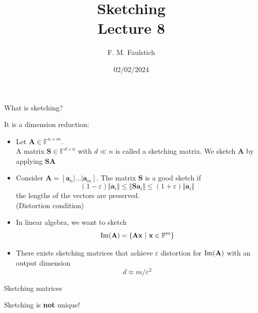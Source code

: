 \documentclass{beamer}
\title{
Sketching\\
Lecture 8
}
\author{F. M. Faulstich}
\date{02/02/2024}
\newcommand{\bvec}[1]{\mathbf{#1}}
\newcommand{\va}{\bvec{a}}
\newcommand{\vx}{\bvec{x}}
\newcommand{\vA}{\bvec{A}}
\newcommand{\vS}{\bvec{S}}
\newcommand{\bitem}{\item[$\bullet$]}
\begin{document}
\frame{\titlepage}

\begin{frame}{What is sketching?}

It is a dimension reduction:\\
\begin{itemize}
    \bitem Let $\vA \in \mathbb{F}^{n \times m}$. \\
    A matrix $\vS\in \mathbb{F}^{d \times n}$ with $d \ll n$ is called a sketching matrix. We sketch $\vA$ by applying $\vS \vA$
    \pause
    \bitem Consider $\vA = [\va_n|...|\va_m]$. The matrix $\vS$ is a good sketch if
    $$
    (1-\varepsilon) \Vert \va_i \Vert
    \leq 
    \Vert \vS \va_i \Vert
    \leq 
    (1+\varepsilon) \Vert \va_i \Vert
    $$
    the lengths of the vectors are preserved.\\
    (Distortion condition)
    \bitem In linear algebra, we want to sketch
    $$
    {\rm Im}(\vA) = \{\vA\vx ~|~ \vx \in\mathbb{F}^{m} \}
    $$
    \bitem There exists sketching matrices that achieve $\varepsilon$ distortion for ${\rm Im}(\vA)$ with an output dimension
    $$
    d \approx m/\varepsilon^2
    $$
\end{itemize}
    
\end{frame}


\begin{frame}{Sketching matrices}

\begin{center}
    Sketching is {\bf not} unique!
\end{center}
    
\end{frame}
\end{document}
